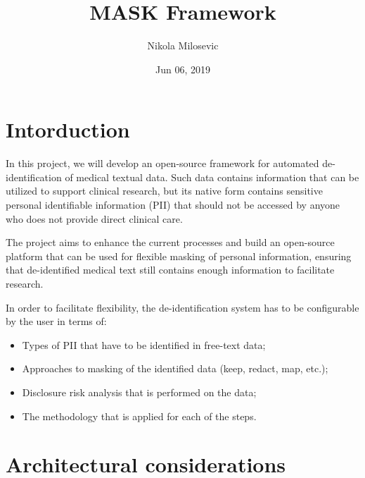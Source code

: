 \documentclass[letterpaper,10pt,english]{sphinxmanual}
\title{MASK Framework}
\date{Jun 06, 2019}
\author{Nikola Milosevic}
\begin{document}
\pagestyle{empty}
\sphinxmaketitle
\pagestyle{plain}
\sphinxtableofcontents
\pagestyle{normal}
\label{\detokenize{index::doc}}



\chapter{Intorduction}
\label{\detokenize{index:intorduction}}

In this project, we will develop an open-source framework for automated de-identification of medical textual data. Such data contains information that can be utilized to support clinical research, but its native form contains sensitive personal identifiable information (PII) that should not be accessed by anyone who does not provide direct clinical care.

The project aims to enhance the current processes and build an open-source platform that can be used for flexible masking of personal information, ensuring that de-identified medical text still contains enough information to facilitate research.

In order to facilitate flexibility, the de-identification system has to be configurable by the user in terms of:
\begin{itemize}
\item {} 
Types of PII that have to be identified in free-text data;

\item {} 
Approaches to masking of the identified data (keep, redact, map, etc.);

\item {} 
Disclosure risk analysis that is performed on the data;

\item {} 
The methodology that is applied for each of the steps.

\end{itemize}


\chapter{Architectural considerations}
\label{\detokenize{index:architectural-considerations}}
\end{document}
